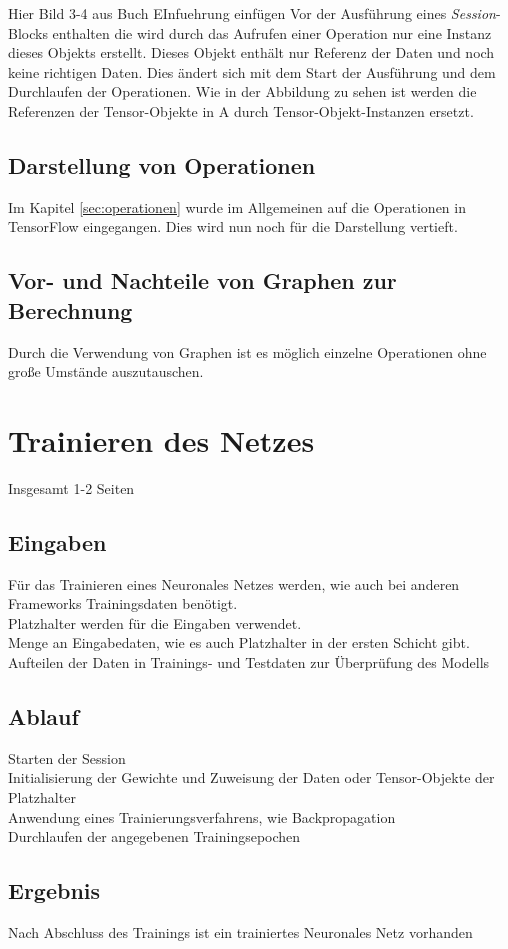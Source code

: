 Hier Bild 3-4 aus Buch EInfuehrung einfügen
Vor der Ausführung eines \textit{Session}-Blocks enthalten die wird durch das Aufrufen einer Operation nur eine Instanz dieses Objekts erstellt. Dieses Objekt enthält nur Referenz der Daten und noch keine richtigen Daten. Dies ändert sich mit dem Start der Ausführung und dem Durchlaufen der Operationen. Wie in der Abbildung zu sehen ist werden die Referenzen der Tensor-Objekte in A durch Tensor-Objekt-Instanzen ersetzt.

\subsection{Darstellung von Operationen}
\label{sec:darstellungOperationen}
Im Kapitel \ref{sec:operationen} wurde im Allgemeinen auf die Operationen in TensorFlow eingegangen. Dies wird nun noch für die Darstellung vertieft. 

\subsection{Vor- und Nachteile von Graphen zur Berechnung}
\label{sec:vorUndNachteile}
Durch die Verwendung von Graphen ist es möglich einzelne Operationen ohne große Umstände auszutauschen.


\section{Trainieren des Netzes}
\label{sec:trainierenDesNetzes}
\printsubchapterauthor{\authorNiklas}
Insgesamt 1-2 Seiten


\subsection{Eingaben}
\label{sec:eingaben}
Für das Trainieren eines Neuronales Netzes werden, wie auch bei anderen Frameworks Trainingsdaten benötigt.\\
Platzhalter werden für die Eingaben verwendet.\\
Menge an Eingabedaten, wie es auch Platzhalter in der ersten Schicht gibt.\\
Aufteilen der Daten in Trainings- und Testdaten zur Überprüfung des Modells\\

\subsection{Ablauf}
\label{sec:ablauf}
Starten der Session\\
Initialisierung der Gewichte und Zuweisung der Daten oder Tensor-Objekte der Platzhalter\\
Anwendung eines Trainierungsverfahrens, wie Backpropagation\\
Durchlaufen der angegebenen Trainingsepochen\\

\subsection{Ergebnis}
\label{sec:ergebnis}
Nach Abschluss des Trainings ist ein trainiertes Neuronales Netz vorhanden\\